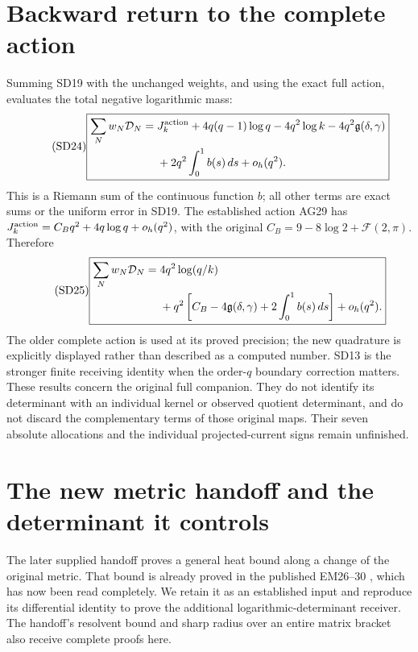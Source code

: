 \section{Backward return to the complete action}
Summing SD19 with the unchanged weights, and using the exact full
action, evaluates the total negative logarithmic mass:
\begin{equation}\tag{SD24}
\boxed{\begin{aligned}
\sum_Nw_N\mathcal D_N={}&J_k^{\rm action}
+4q(q-1)\log q-4q^2\log k-4q^2\mathfrak g(\delta,\gamma)\\
&+2q^2\int_0^1 b(s)\,d s+o_h(q^2).
\end{aligned}}
\end{equation}
This is a Riemann sum of the continuous function $b$; all other terms
are exact sums or the uniform error in SD19. The established action
AG29 \cite{osd:AG} has $J_k^{\rm action}=C_Bq^2+4q\log q+o_h(q^2)$,
with the original $C_B=9-8\log2+\mathcal F(2,\pi)$. Therefore
\begin{equation}\tag{SD25}
\boxed{\begin{aligned}
\sum_Nw_N\mathcal D_N={}&4q^2\log(q/k)\\
&+q^2\left[C_B-4\mathfrak g(\delta,\gamma)
+2\int_0^1b(s)\,d s\right]+o_h(q^2).
\end{aligned}}
\end{equation}
The older complete action is used at its proved precision; the new
quadrature is explicitly displayed rather than described as a computed
number. SD13 is the stronger finite receiving identity when the
order-$q$ boundary correction matters. These results concern the
original full companion. They do not identify its determinant with an
individual kernel or observed quotient determinant, and do not discard
the complementary terms of those original maps. Their seven absolute
allocations and the individual projected-current signs remain unfinished.

\section{The new metric handoff and the determinant it controls}
The later supplied handoff \cite[Section 1]{osd:metricintake} proves a
general heat bound along a change of the original metric. That bound is
already proved in the published EM26--30 \cite{osd:EM}, which has now been
read completely. We retain it as an established input and reproduce its
differential identity to prove the additional logarithmic-determinant
receiver. The handoff's resolvent bound and sharp radius over an entire
matrix bracket also receive complete proofs here.

